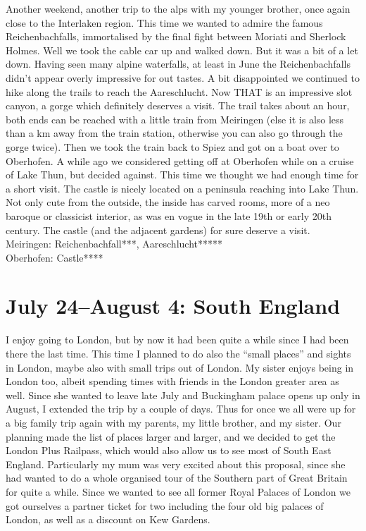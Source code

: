 Another weekend, another trip to the alps with my younger brother, once again close to the Interlaken region. This time we wanted to admire the famous Reichenbachfalls, immortalised by the final fight between Moriati and Sherlock Holmes. Well we took the cable car up and walked down. But it was a bit of a let down. Having seen many alpine waterfalls, at least in June the Reichenbachfalls didn't appear overly impressive for out tastes. A bit disappointed we continued to hike along the trails to reach the Aareschlucht. Now THAT is an impressive slot canyon, a gorge which definitely deserves a visit. The trail takes about an hour, both ends can be reached with a little train from Meiringen (else it is also less than a km away from the train station, otherwise you can also go through the gorge twice). Then we took the train back to Spiez and got on a boat over to Oberhofen. A while ago we considered getting off at Oberhofen while on a cruise of Lake Thun, but decided against. This time we thought we had enough time for a short visit. The castle is nicely located on a peninsula reaching into Lake Thun. Not only cute from the outside, the inside has carved rooms, more of a neo baroque or classicist interior, as was en vogue in the late 19th or early 20th century. The castle (and the adjacent gardens) for sure deserve a visit.\\

Meiringen: Reichenbachfall***, Aareschlucht*****\\
Oberhofen: Castle****

\section{July 24--August 4: South England}
\label{southengland2014}

I enjoy going to London, but by now it had been quite a while since I had been there the last time. This time I planned to do also the ``small places'' and sights in London, maybe also with small trips out of London. My sister enjoys being in London too, albeit spending times with friends in the London greater area as well. Since she wanted to leave late July and Buckingham palace opens up only in August, I extended the trip by a couple of days. Thus for once we all were up for a big family trip again with my parents, my little brother, and my sister. Our planning made the list of places larger and larger, and we decided to get the London Plus Railpass, which would also allow us to see most of South East England. Particularly my mum was very excited about this proposal, since she had wanted to do a whole organised tour of the Southern part of Great Britain for quite a while. Since we wanted to see all former Royal Palaces of London we got ourselves a partner ticket for two including the four old big palaces of London, as well as a discount on Kew Gardens.\\

